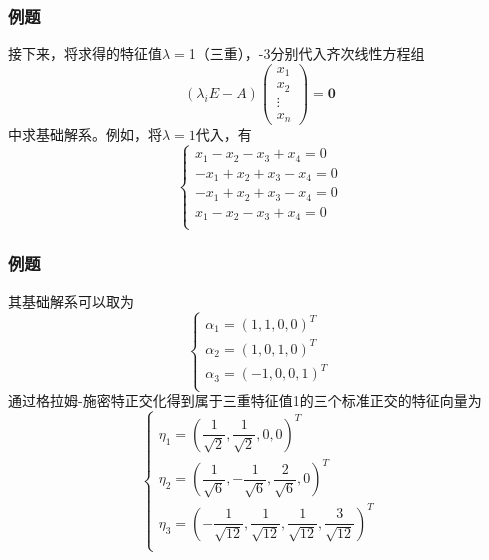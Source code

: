
\begin{frame}
\frametitle{例题}

接下来，将求得的特征值$\lambda = $1（三重），-3分别代入齐次线性方程组
$$\left( \lambda_i E - A \right) \begin{pmatrix} x_1 \\ x_2 \\ \vdots \\ x_n \end{pmatrix} = \mathbf{0}$$
中求基础解系。例如，将$\lambda = 1$代入，有
$$\begin{cases}
x_1 - x_2 - x_3 + x_4 = 0 \\
-x_1 + x_2 + x_3 - x_4 = 0 \\
-x_1 + x_2 + x_3 - x_4 = 0 \\
x_1 - x_2 - x_3 + x_4 = 0 \\
\end{cases}$$

\end{frame}


\begin{frame}
\frametitle{例题}

其基础解系可以取为
$$\begin{cases}
\alpha_1 = (1,1,0,0)^T \\
\alpha_2 = (1,0,1,0)^T \\
\alpha_3 = (-1,0,0,1)^T \\
\end{cases}$$
通过格拉姆-施密特正交化得到属于三重特征值1的三个标准正交的特征向量为
$$\begin{cases}
\eta_1 = \left(\dfrac{1}{\sqrt{2}},\dfrac{1}{\sqrt{2}},0,0 \right)^T \\
\eta_2 = \left(\dfrac{1}{\sqrt{6}},-\dfrac{1}{\sqrt{6}},\dfrac{2}{\sqrt{6}},0 \right)^T \\
\eta_3 = \left(-\dfrac{1}{\sqrt{12}},\dfrac{1}{\sqrt{12}},\dfrac{1}{\sqrt{12}},\dfrac{3}{\sqrt{12}} \right)^T \\
\end{cases}$$

\end{frame}


